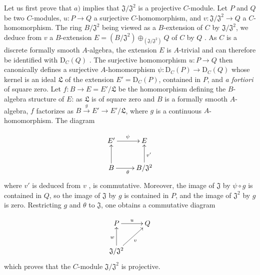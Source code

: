 \begin{env}[19.5.4.1]
\label{0.19.5.4.1}
Let us first prove that $a)$ implies that $\mathfrak{J}/\mathfrak{J}^2$ is a projective $C$-module.
Let $P$ and $Q$ be two $C$-modules, $u:P\to Q$ a surjective $C$-homomorphism, and $v:\mathfrak{J}/\mathfrak{J}^2\to Q$ a $C$-homomorphism.
The ring $B/\mathfrak{J}^2$ being viewed as a $B$-extension of $C$ by $\mathfrak{J}/\mathfrak{J}^2$, we deduce from $v$ a $B$-extension $E=(B/\mathfrak{J}^2)\oplus_{(\mathfrak{J}/\mathfrak{J}^2)}Q$ of $C$ by $Q$ .
As $C$ is a discrete formally smooth $A$-algebra, the extension $E$ is $A$-trivial  and can therefore be identified with $\mathrm{D}_C(Q)$ .
The surjective homomorphism $u:P\to Q$ then canonically defines a surjective $A$-homomorphism $\psi:\mathrm{D}_C(P)\to\mathrm{D}_C(Q)$  whose kernel is an ideal $\mathfrak{L}$ of the extension $E'=\mathrm{D}_C(P)$, contained in $P$, and \emph{a fortiori} of square zero.
Let $f:B\to E=E'/\mathfrak{L}$ be the homomorphism defining the $B$-algebra structure of $E$: as $\mathfrak{L}$ is of square zero and $B$ is a formally smooth $A$-algebra,
$f$ factorizes as $B\xrightarrow{g}E'\to E'/\mathfrak{L}$, where $g$ is a continuous $A$-homomorphism.
The diagram

\[
\xymatrix{
    E' \ar[r]^{\psi} & E \\
    B \ar[u] \ar[r]_{\theta} & B/\mathfrak{J}^2 \ar[u]_{v'}
  }
\]
where $v'$ is deduced from $v$ , is commutative.
Moreover, the image of $\mathfrak{J}$ by $\psi\circ g$ is contained in $Q$, so the image of $\mathfrak{J}$ by $g$ is contained in $P$, and the image of $\mathfrak{J}^2$ by $g$ is zero.
Restricting $g$ and $\theta$ to $\mathfrak{J}$, one obtains a commutative diagram

\[
\xymatrix{
    P \ar[r]^{u} & Q \\
    \mathfrak{J}/\mathfrak{J}^2 \ar[u]^{w} \ar[ur]_{v}
  }
\]
which proves that the $C$-module $\mathfrak{J}/\mathfrak{J}^2$ is projective.
\end{env}

